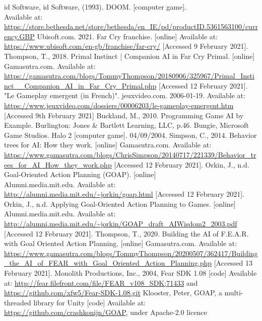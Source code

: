 \documentclass[12pt]{report}
\begin{document}
\begin{thebibliography}{}
    id Software, id Software, (1993). DOOM. [computer game]. \\Available at: \url{https://store.bethesda.net/store/bethesda/en_IE/pd/productID.5361563100/currency.GBP}
    Ubisoft.com. 2021. Far Cry franchise. [online] Available at: \url{https://www.ubisoft.com/en-gb/franchise/far-cry/} [Accessed 9 February 2021].
    Thompson, T., 2018. Primal Instinct | Companion AI in Far Cry Primal. [online] Gamasutra.com. Available at: \url{https://gamasutra.com/blogs/TommyThompson/20180906/325967/Primal_Instinct__Companion_AI_in_Far_Cry_Primal.php} [Accessed 12 February 2021].
    "Le Gameplay emergent (in French)". jeuxvideo.com. 2006-01-19. Available at: \url{https://www.jeuxvideo.com/dossiers/00006203/le-gameplay-emergent.htm} [Accessed 9th February 2021]
    Buckland, M., 2010. Programming Game AI by Example. Burlington: Jones \& Bartlett Learning, LLC, p.46.
    Bungie, Microsoft Game Studios. Halo 2 [computer game]. 04/09/2004.
    Simpson, C., 2014. Behavior trees for AI: How they work. [online] Gamasutra.com. Available at: \url{https://www.gamasutra.com/blogs/ChrisSimpson/20140717/221339/Behavior_trees_for_AI_How_they_work.php} [Accessed 12 February 2021].
    Orkin, J., n.d. Goal-Oriented Action Planning (GOAP). [online] \\Alumni.media.mit.edu. Available at: \url{http://alumni.media.mit.edu/~jorkin/goap.html} [Accessed 12 February 2021].
    Orkin, J., n.d. Applying Goal-Oriented Action Planning to Games. [online] \\Alumni.media.mit.edu. Available at: \url{http://alumni.media.mit.edu/~jorkin/GOAP_draft_AIWisdom2_2003.pdf} [Accessed 12 February 2021].
    Thompson, T., 2020. Building the AI of F.E.A.R. with Goal Oriented Action Planning. [online] Gamasutra.com. Available at: \url{https://www.gamasutra.com/blogs/TommyThompson/20200507/362417/Building_the_AI_of_FEAR_with_Goal_Oriented_Action_Planning.php} [Accessed 13 February 2021].
    Monolith Productions, Inc., 2004, Fear SDK 1.08 [code] Available at: \url{http://fear.filefront.com/file/FEAR_v108_SDK;71433} and \url{https://github.com/xfw5/Fear-SDK-1.08.git}
    Klooster, Peter, GOAP, a multi-threaded library for Unity [code] Available at: \url{https://github.com/crashkonijn/GOAP}, under Apache-2.0 licence

\end{thebibliography}
\end{document}
